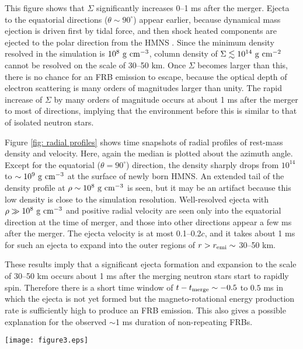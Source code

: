 \documentclass[]{pasj01}
\begin{document}
This figure shows that $\Sigma$ significantly increases 0--1 ms after
the merger. Ejecta to the equatorial directions ($\theta \sim
90^\circ$) appear earlier, because dynamical mass ejection is driven
first by tidal force, and then shock heated components are ejected to
the polar direction from the HMNS \citep{Sekiguchi2015}. Since the
minimum density resolved in the simulation is $10^8 \ \rm g
\ cm^{-3}$, column density of $\Sigma \lesssim 10^{14} \ \rm g
\ cm^{-2}$ cannot be resolved on the scale of 30--50 km.  Once
$\Sigma$ becomes larger than this, there is no chance for an FRB
emission to escape, because the optical depth of electron scattering
is many orders of magnitudes larger than unity.  The rapid increase of
$\Sigma$ by many orders of magnitude occurs at about 1 ms after the
merger to most of directions, implying that the environment
before this is similar to that of isolated neutron stars.

Figure \ref{fig: radial profiles} shows time snapshots of radial
profiles of rest-mass density and velocity. Here, again the median is
plotted about the azimuth angle.  Except for the equatorial ($\theta =
90^\circ$) direction, the density sharply drops from $10^{14}$ to
$\sim 10^9 \ \rm g \ cm^{-3}$ at the surface of newly born HMNS. An
extended tail of the density profile at $\rho \sim 10^8 \ \rm g
\ cm^{-3}$ is seen, but it may be an artifact because this low density
is close to the simulation resolution.  Well-resolved ejecta with
$\rho \gg 10^8 \ \rm g \ cm^{-3}$ and positive radial velocity are
seen only into the equatorial direction at the time of merger, and
those into other directions appear a few ms after the merger.  The
ejecta velocity is at most 0.1--0.2$c$, and it takes about 1 ms for
such an ejecta to expand into the outer regions of $r > r_{\rm emi}
\sim$ 30--50 km.

These results imply that a significant ejecta formation and expansion
to the scale of 30--50 km occurs about 1 ms after the merging
neutron stars start to rapidly spin.  Therefore there is a short time
window of $t - t_{\rm merge} \sim -0.5$ to $0.5$ ms in which the
ejecta is not yet formed but the magneto-rotational energy production
rate is sufficiently high to produce an FRB emission. This also gives a
possible explanation for the observed $\sim$1 ms duration of 
non-repeating FRBs.

\begin{figure*}
 \texttt{[image: figure3.eps]}
 \caption{Time snapshots (corresponding to figure \ref{fig: snapshots})
 of radial profiles of rest-mass density
   (solid colored lines) and radial fluid velocity (dashed colored
   lines), for several values of polar angle $\theta$ from the $z$
   axis. These quantities are the median about the azimuthal angle
   $\phi$.  The radius is measured from the merger center.  
}
 \label{fig: radial profiles}
\end{figure*}
\end{document}
